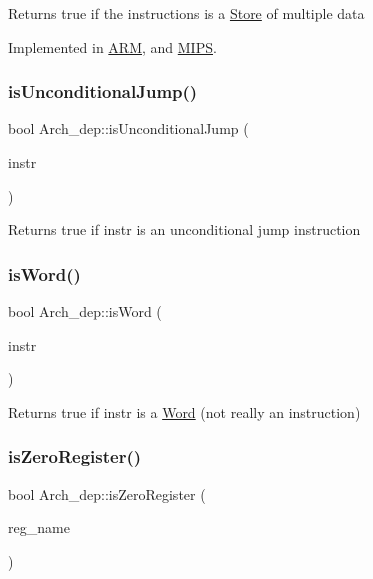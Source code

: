Returns true if the instructions is a \hyperlink{classStore}{Store} of multiple data 

Implemented in \hyperlink{classARM_a2c8848aa0ead5e445c3f637d527fae03}{A\+RM}, and \hyperlink{classMIPS_a781bec4f737ea512ada3f3fa166463c9}{M\+I\+PS}.

\mbox{\label{classArch__dep_ac03cfb1337393303f438f7915bcc23a9}} 
\subsubsection{\texorpdfstring{is\+Unconditional\+Jump()}{isUnconditionalJump()}}
{\footnotesize\ttfamily bool Arch\+\_\+dep\+::is\+Unconditional\+Jump (\begin{DoxyParamCaption}\item[{const \hyperlink{classObjdumpInstruction}{Objdump\+Instruction} \&}]{instr }\end{DoxyParamCaption})}

Returns true if instr is an unconditional jump instruction \mbox{\label{classArch__dep_a690346c11242f24dc8d692f864e20ccc}} 
\subsubsection{\texorpdfstring{is\+Word()}{isWord()}}
{\footnotesize\ttfamily bool Arch\+\_\+dep\+::is\+Word (\begin{DoxyParamCaption}\item[{const \hyperlink{classObjdumpInstruction}{Objdump\+Instruction} \&}]{instr }\end{DoxyParamCaption})}

Returns true if instr is a \hyperlink{classWord}{Word} (not really an instruction) \mbox{\label{classArch__dep_aaf6d066028c438c8e01194eb13500468}} 
\subsubsection{\texorpdfstring{is\+Zero\+Register()}{isZeroRegister()}}
{\footnotesize\ttfamily bool Arch\+\_\+dep\+::is\+Zero\+Register (\begin{DoxyParamCaption}\item[{const string \&}]{reg\+\_\+name }\end{DoxyParamCaption})}

